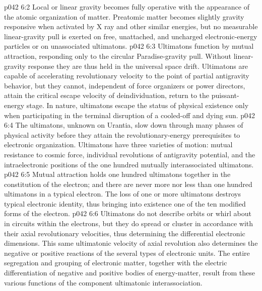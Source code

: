 \vs p042 6:2 Local or linear gravity becomes fully operative with the appearance of the atomic organization of matter. Preatomic matter becomes slightly gravity responsive when activated by X ray and other similar energies, but no measurable linear\hyp{}gravity pull is exerted on free, unattached, and uncharged electronic\hyp{}energy particles or on unassociated ultimatons.
\vs p042 6:3 \pc Ultimatons function by mutual attraction, responding only to the circular Paradise\hyp{}gravity pull. Without linear\hyp{}gravity response they are thus held in the universal space drift. Ultimatons are capable of accelerating revolutionary velocity to the point of partial antigravity behavior, but they cannot, independent of force organizers or power directors, attain the critical escape velocity of deindividuation, return to the puissant\hyp{}energy stage. In nature, ultimatons escape the status of physical existence only when participating in the terminal disruption of a cooled\hyp{}off and dying sun.
\vs p042 6:4 \pc The ultimatons, unknown on Urantia, slow down through many phases of physical activity before they attain the revolutionary\hyp{}energy prerequisites to electronic organization. Ultimatons have three varieties of motion: mutual resistance to cosmic force, individual revolutions of antigravity potential, and the intraelectronic positions of the one hundred mutually interassociated ultimatons.
\vs p042 6:5 Mutual attraction holds one hundred ultimatons together in the constitution of the electron; and there are never more nor less than one hundred ultimatons in a typical electron. The loss of one or more ultimatons destroys typical electronic identity, thus bringing into existence one of the ten modified forms of the electron.
\vs p042 6:6 Ultimatons do not describe orbits or whirl about in circuits within the electrons, but they do spread or cluster in accordance with their axial revolutionary velocities, thus determining the differential electronic dimensions. This same ultimatonic velocity of axial revolution also determines the negative or positive reactions of the several types of electronic units. The entire segregation and grouping of electronic matter, together with the electric differentiation of negative and positive bodies of energy\hyp{}matter, result from these various functions of the component ultimatonic interassociation.
